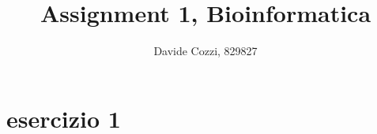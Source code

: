 \documentclass[a4paper,12pt, oneside]{book}
\title{Assignment 1, Bioinformatica}
\author{Davide Cozzi, 829827}
\date{}
\begin{document}
\maketitle

\newtheorem{teorema}{Teorema}
\newtheorem{definizione}{Definizione}
\newtheorem{esempio}{Esempio}
\newtheorem{corollario}{Corollario}
\newtheorem{lemma}{Lemma}
\newtheorem{osservazione}{Osservazione}
\newtheorem{nota}{Nota}
\newtheorem{esercizio}{Esercizio}

\renewcommand{\chaptermark}[1]{%
  \markboth{\chaptername
    \ \thechapter.\ #1}{}}
\renewcommand{\sectionmark}[1]{\markright{\thesection.\ #1}}
\chapter{esercizio 1}
\end{document}
